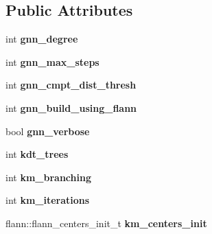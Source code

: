 \subsection*{Public Attributes}
\begin{DoxyCompactItemize}
\item 
\hypertarget{structmtf_1_1NNIndexParams_a96f3c9b17f2385d389aa3c6c983b00c7}{int {\bfseries gnn\-\_\-degree}}\label{structmtf_1_1NNIndexParams_a96f3c9b17f2385d389aa3c6c983b00c7}

\item 
\hypertarget{structmtf_1_1NNIndexParams_a4f0f23bfc159d51e5d9961d0670acbe9}{int {\bfseries gnn\-\_\-max\-\_\-steps}}\label{structmtf_1_1NNIndexParams_a4f0f23bfc159d51e5d9961d0670acbe9}

\item 
\hypertarget{structmtf_1_1NNIndexParams_add65c30f21fa9327d8778a8eee13acb6}{int {\bfseries gnn\-\_\-cmpt\-\_\-dist\-\_\-thresh}}\label{structmtf_1_1NNIndexParams_add65c30f21fa9327d8778a8eee13acb6}

\item 
\hypertarget{structmtf_1_1NNIndexParams_a071d0a057dc6746ecb61931a97454b41}{int {\bfseries gnn\-\_\-build\-\_\-using\-\_\-flann}}\label{structmtf_1_1NNIndexParams_a071d0a057dc6746ecb61931a97454b41}

\item 
\hypertarget{structmtf_1_1NNIndexParams_a30e12012204b4ff8193bd04a77dfd676}{bool {\bfseries gnn\-\_\-verbose}}\label{structmtf_1_1NNIndexParams_a30e12012204b4ff8193bd04a77dfd676}

\item 
\hypertarget{structmtf_1_1NNIndexParams_ab37e8616aa287e2455f5e4ce326187e9}{int {\bfseries kdt\-\_\-trees}}\label{structmtf_1_1NNIndexParams_ab37e8616aa287e2455f5e4ce326187e9}

\item 
\hypertarget{structmtf_1_1NNIndexParams_adecf6f6a008cdab30c927b2f14e8224a}{int {\bfseries km\-\_\-branching}}\label{structmtf_1_1NNIndexParams_adecf6f6a008cdab30c927b2f14e8224a}

\item 
\hypertarget{structmtf_1_1NNIndexParams_a459892c0ce18902726387d149f4c8a72}{int {\bfseries km\-\_\-iterations}}\label{structmtf_1_1NNIndexParams_a459892c0ce18902726387d149f4c8a72}

\item 
\hypertarget{structmtf_1_1NNIndexParams_a9da9e406c3dddf5259aaefee86033956}{flann\-::flann\-\_\-centers\-\_\-init\-\_\-t {\bfseries km\-\_\-centers\-\_\-init}}\label{structmtf_1_1NNIndexParams_a9da9e406c3dddf5259aaefee86033956}


\end{DoxyCompactItemize}
